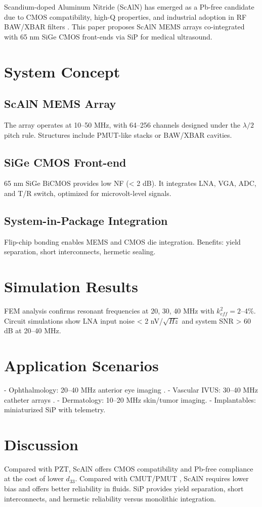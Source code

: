 \documentclass[conference]{IEEEtran}
\begin{document}
Scandium-doped Aluminum Nitride (ScAlN) has emerged as a Pb-free candidate due to CMOS compatibility, high-Q properties, 
and industrial adoption in RF BAW/XBAR filters \cite{akrout2018scaln}. 
This paper proposes ScAlN MEMS arrays co-integrated with 65 nm SiGe CMOS front-ends via SiP for medical ultrasound.

\section{System Concept}
\subsection{ScAlN MEMS Array}
The array operates at 10--50 MHz, with 64--256 channels designed under the $\lambda/2$ pitch rule. 
Structures include PMUT-like stacks or BAW/XBAR cavities.

\subsection{SiGe CMOS Front-end}
65 nm SiGe BiCMOS provides low NF (< 2 dB). 
It integrates LNA, VGA, ADC, and T/R switch, optimized for microvolt-level signals.

\subsection{System-in-Package Integration}
Flip-chip bonding enables MEMS and CMOS die integration. 
Benefits: yield separation, short interconnects, hermetic sealing.

\section{Simulation Results}
FEM analysis confirms resonant frequencies at 20, 30, 40 MHz with $k^2_{eff} = 2$--4\%. 
Circuit simulations show LNA input noise < 2 nV/$\sqrt{Hz}$ and system SNR > 60 dB at 20--40 MHz.

\section{Application Scenarios}
- Ophthalmology: 20--40 MHz anterior eye imaging \cite{pavlin2009ubm}.  
- Vascular IVUS: 30--40 MHz catheter arrays \cite{foster2000ivus}.  
- Dermatology: 10--20 MHz skin/tumor imaging.  
- Implantables: miniaturized SiP with telemetry.

\section{Discussion}
Compared with PZT, ScAlN offers CMOS compatibility and Pb-free compliance at the cost of lower $d_{33}$.  
Compared with CMUT/PMUT \cite{khuri2009cmut}, ScAlN requires lower bias and offers better reliability in fluids.  
SiP provides yield separation, short interconnects, and hermetic reliability versus monolithic integration.
\end{document}

